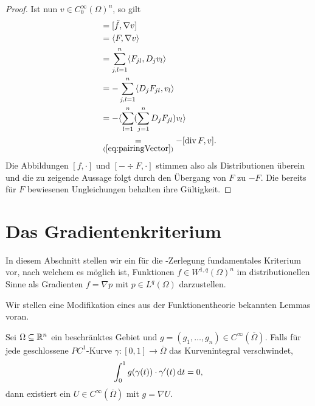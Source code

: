 \begin{proof}
  Ist nun $v \in C_0^\infty(\Omega)^n$, so gilt
  \begin{align*}
    [f,v]
    &= [\tilde f, \nabla v] \\
    &= \langle F, \nabla v\rangle \\
    &= \sum_{j,l=1}^n \langle F_{jl}, D_j v_l \rangle \\
    &= -\sum_{j,l=1}^n \langle D_j F_{jl}, v_l \rangle \\
    &= - \langle \sum_{l = 1}^n ( \sum_{j = 1}^n D_j F_{jl} ) v_l \rangle \\
    &\underset{(\ref{eq:pairingVector})}{=} -[\div F, v]. \\
  \end{align*}
  Die Abbildungen $[f,\cdot]$ und $[-\div F, \cdot]$ stimmen also als Distributionen überein und die zu zeigende Aussage folgt durch den Übergang von $F$ zu $-F$.
  Die bereits für $F$ bewiesenen Ungleichungen behalten ihre Gültigkeit.
\end{proof}

\newpage
\section{Das Gradientenkriterium}

In diesem Abschnitt stellen wir ein für die \helmholtz\hyp{}Zerlegung fundamentales Kriterium vor, nach welchem es möglich ist, Funktionen $f \in W^{1,q}(\Omega)^n$ im distributionellen Sinne als Gradienten $f = \nabla p$ mit $p \in L^q(\Omega)$ darzustellen.

Wir stellen eine Modifikation eines aus der Funktionentheorie bekannten Lemmas voran.

\begin{lem}
  \label{lem:existencePotential}
  Sei $\Omega \subseteq \mathbb{R}^n$ ein beschränktes Gebiet und $g = (g_1, \dots, g_n) \in C^\infty(\overline\Omega)$.
  Falls für jede geschlossene $PC^1$-Kurve $\gamma \colon [0,1] \to \overline\Omega$ das Kurvenintegral verschwindet,
$$
  \int_0^1 g(\gamma(t)) \cdot \gamma'(t) \, {\operatorname{d}\!{t}} = 0,  
$$
  dann existiert ein $U\in C^\infty(\overline\Omega)$ mit $g = \nabla U$.
\end{lem}


